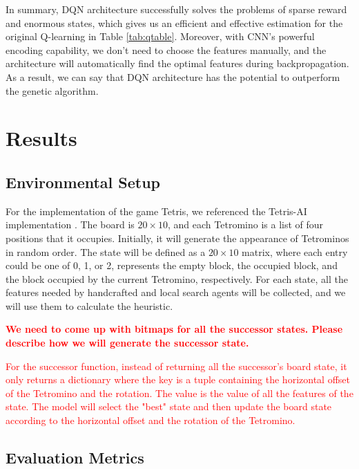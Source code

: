 \documentclass[letterpaper]{article} %
\begin{document}
In summary, DQN architecture successfully solves the problems of sparse reward and enormous states, which gives us an efficient and effective estimation for the original Q-learning in Table \ref{tab:qtable}. Moreover, with CNN's powerful encoding capability, we don't need to choose the features manually, and the architecture will automatically find the optimal features during backpropagation. As a result, we can say that DQN architecture has the potential to outperform the genetic algorithm.


\section{Results}
\subsection{Environmental Setup}
For the implementation of the game Tetris, we referenced the Tetris-AI implementation \cite{Nuno}. The board is $20 \times 10$, and each Tetromino is a list of four positions that it occupies. Initially, it will generate the appearance of Tetrominos in random order. The state will be defined as a $20 \times 10$ matrix, where each entry could be one of 0, 1, or 2, represents the empty block, the occupied block, and the block occupied by the current Tetromino, respectively. For each state, all the features needed by handcrafted and local search agents will be collected, and we will use them to calculate the heuristic. 

\textcolor{red}{\textbf{We need to come up with bitmaps for all the successor states. Please describe how we will generate the successor state.} }

\textcolor{red}{For the successor function, instead of returning all the successor's board state, it only returns a dictionary where the key is a tuple containing the horizontal offset of the Tetromino and the rotation. The value is the value of all the features of the state. The model will select the "best" state and then update the board state according to the horizontal offset and the rotation of the Tetromino.}
\subsection{Evaluation Metrics}
\end{document}
